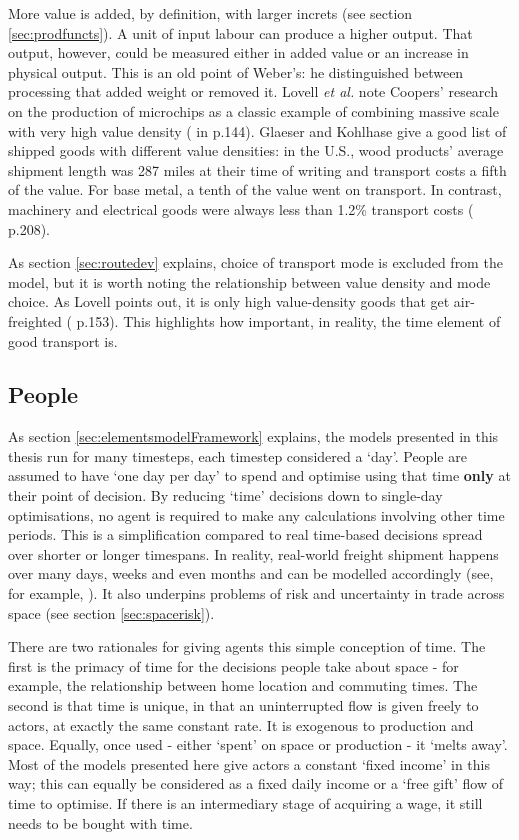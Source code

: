{More value is added, by definition, with larger \gls{increts} (see section \ref{sec:prodfuncts}). A unit of input labour can produce a higher output. That output, however, could be measured either in added value or an increase in physical output. This is an old point of Weber's: he distinguished between processing that added weight or removed it. Lovell \emph{et al.} note Coopers' research on the production of microchips as a classic example of combining massive scale with very high value density (\citealt{cooper_logistics_1990} in \citealt{lovell_product_2005} p.144). Glaeser and Kohlhase give a good list of shipped goods with different value densities: in the U.S., wood products' average shipment length was 287 miles at their time of writing and transport costs a fifth of the value. For base metal, a tenth of the value went on transport. In contrast, machinery and electrical goods were always less than 1.2\% transport costs (\citealt{glaeser_cities_2004} p.208).

As section \ref{sec:routedev} explains, choice of transport mode is excluded from the model, but it is worth noting the relationship between value density and mode choice. As Lovell points out, it is only high value-density goods that get air-freighted (\citealt{lovell_product_2005} p.153). This highlights how important, in reality, the time element of good transport is. 

\subsection{People \label{sec:peoplemoving}}

As section \ref{sec:elementsmodelFramework} explains, the models presented in this thesis run for many timesteps, each timestep considered a `day'. People are assumed to have `one day per day' to spend and optimise using that time \textbf{only} at their point of decision. By reducing `time' decisions down to single-day optimisations, no agent is required to make any calculations involving other time periods. This is a simplification compared to real time-based decisions spread over shorter or longer timespans. In reality, real-world freight shipment happens over many days, weeks and even months and can be modelled accordingly (see, for example, \citealt{hummels_time_2001}). It also underpins problems of risk and uncertainty in trade across space (see section \ref{sec:spacerisk}). 

There are two rationales for giving agents this simple conception of time. The first is the primacy of time for the decisions people take about space - for example, the relationship between home location and commuting times. The second is that time is unique, in that an uninterrupted flow is given freely to actors, at exactly the same constant rate. It is exogenous to production and space. Equally, once used - either `spent' on space or production - it `melts away'. Most of the models presented here give actors a constant `fixed income' in this way; this can equally be considered as a fixed daily income or a `free gift' flow of time to optimise. If there is an intermediary stage of acquiring a wage, it still needs to be bought with time. 

}
